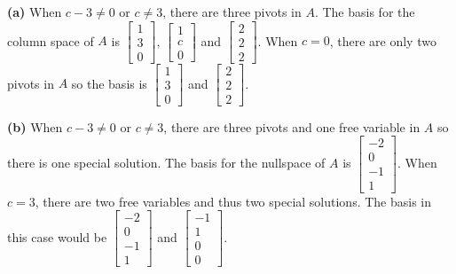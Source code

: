 \documentclass[11pt]{article}
\renewcommand\part[1]{\vspace{.10in}\textbf{(#1)}}
\begin{document}
\part{a} 
When \(c - 3 \neq 0\) or \(c \neq 3\), there are three pivots in \(A\). The basis for the column space of \(A\) is \(\begin{bmatrix} 1 \\ 3 \\ 0 \end{bmatrix}\), \(\begin{bmatrix} 1 \\ c \\ 0 \end{bmatrix}\) and \(\begin{bmatrix} 2 \\ 2 \\ 2 \end{bmatrix}\). When \(c = 0\), there are only two pivots in \(A\) so the basis is \(\begin{bmatrix} 1 \\ 3 \\ 0 \end{bmatrix}\) and \(\begin{bmatrix} 2 \\ 2 \\ 2 \end{bmatrix}\).

\part{b} 
When \(c - 3 \neq 0\) or \(c \neq 3\), there are three pivots and one free variable in \(A\) so there is one special solution. The basis for the nullspace of \(A\) is \(\begin{bmatrix} -2 \\ 0 \\ -1 \\ 1 \end{bmatrix}\). When \(c = 3\), there are two free variables and thus two special solutions. The basis in this case would be \(\begin{bmatrix} -2 \\ 0 \\ -1 \\ 1 \end{bmatrix}\) and \(\begin{bmatrix} -1 \\ 1 \\ 0 \\ 0 \end{bmatrix}\).
\end{document}
